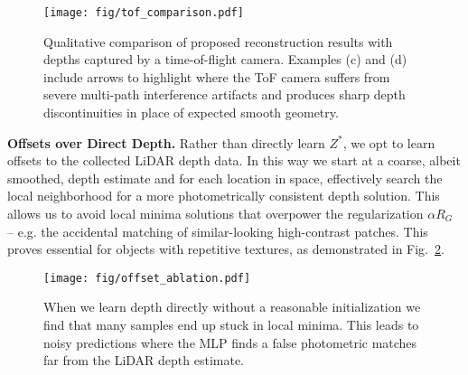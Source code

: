 \begin{figure}[t]
    \centering
    \texttt{[image: fig/tof\_comparison.pdf]}
    \caption{Qualitative comparison of proposed reconstruction results with depths captured by a time-of-flight camera. Examples (c) and (d) include arrows to highlight where the ToF camera suffers from severe multi-path interference artifacts and produces sharp depth discontinuities in place of expected smooth geometry.}
    \label{fig:tof-comparison}
\end{figure}

\vspace{0.5em}\noindent\textbf{Offsets over Direct Depth.}\hspace{0.1em} Rather than directly learn $Z^*$, we opt to learn offsets to the collected LiDAR depth data. In this way we start at a coarse, albeit smoothed, depth estimate and for each location in space, effectively search the local neighborhood for a more photometrically consistent depth solution. This allows us to avoid local minima solutions that overpower the regularization $\alpha R_G$ -- e.g. the accidental matching of similar-looking high-contrast patches. This proves essential for objects with repetitive textures, as demonstrated in Fig.~\ref{fig:offset-ablation}. 

\begin{figure}[h]
    \centering
    \texttt{[image: fig/offset\_ablation.pdf]}
    \caption{When we learn depth directly without a reasonable initialization we find that many samples end up stuck in local minima. This leads to noisy predictions where the MLP finds a false photometric matches far from the LiDAR depth estimate.}
    \label{fig:offset-ablation}
    \vspace{-1em}
\end{figure}





